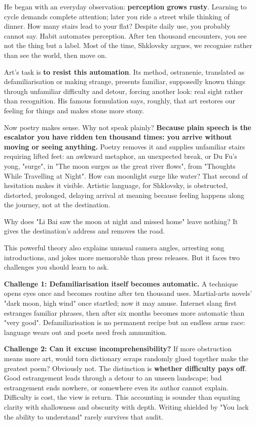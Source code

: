 He began with an everyday observation: \textbf{perception grows rusty}. Learning to cycle demands complete attention; later you ride a street while thinking of dinner. How many stairs lead to your flat? Despite daily use, you probably cannot say. Habit automates perception. After ten thousand encounters, you see not the thing but a label. Most of the time, Shklovsky argues, we recognise rather than see the world, then move on.

Art's task is \textbf{to resist this automation}. Its method, ostranenie, translated as defamiliarisation or making strange, presents familiar, supposedly known things through unfamiliar difficulty and detour, forcing another look: real sight rather than recognition. His famous formulation says, roughly, that art restores our feeling for things and makes stone more stony.

Now poetry makes sense. Why not speak plainly? \textbf{Because plain speech is the escalator you have ridden ten thousand times: you arrive without moving or seeing anything.} Poetry removes it and supplies unfamiliar stairs requiring lifted feet: an awkward metaphor, an unexpected break, or Du Fu's yong, "surge", in "The moon surges as the great river flows", from "Thoughts While Travelling at Night". How can moonlight surge like water? That second of hesitation makes it visible. Artistic language, for Shklovsky, is obstructed, distorted, prolonged, delaying arrival at meaning because feeling happens along the journey, not at the destination.

Why does "Li Bai saw the moon at night and missed home" leave nothing? It gives the destination's address and removes the road.

This powerful theory also explains unusual camera angles, arresting song introductions, and jokes more memorable than press releases. But it faces two challenges you should learn to ask.

\textbf{Challenge 1: Defamiliarisation itself becomes automatic.} A technique opens eyes once and becomes routine after ten thousand uses. Martial-arts novels' "dark moon, high wind" once startled; now it may amuse. Internet slang first estranges familiar phrases, then after six months becomes more automatic than "very good". Defamiliarisation is no permanent recipe but an endless arms race: language wears out and poets need fresh ammunition.

\textbf{Challenge 2: Can it excuse incomprehensibility?} If more obstruction means more art, would torn dictionary scraps randomly glued together make the greatest poem? Obviously not. The distinction is \textbf{whether difficulty pays off}. Good estrangement leads through a detour to an unseen landscape; bad estrangement ends nowhere, or somewhere even its author cannot explain. Difficulty is cost, the view is return. This accounting is sounder than equating clarity with shallowness and obscurity with depth. Writing shielded by "You lack the ability to understand" rarely survives that audit.

